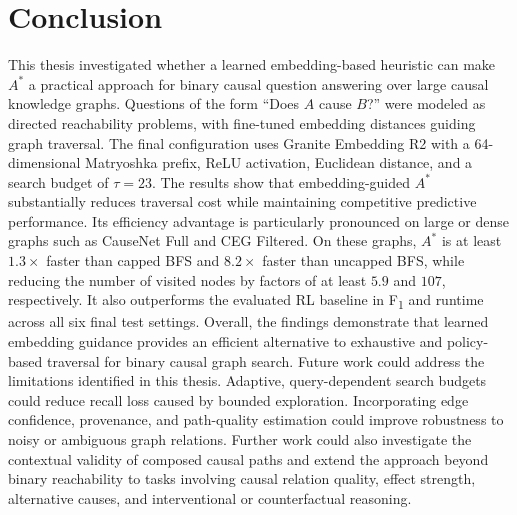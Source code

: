 \chapter{Conclusion}
\label{chap:conclusion}

This thesis investigated whether a learned embedding-based heuristic can make $A^*$ a practical approach for binary causal question answering over large causal knowledge graphs. Questions of the form ``Does $A$ cause $B$?'' were modeled as directed reachability problems, with fine-tuned embedding distances guiding graph traversal. The final configuration uses Granite Embedding R2 with a 64-dimensional Matryoshka prefix, ReLU activation, Euclidean distance, and a search budget of $\tau=23$. The results show that embedding-guided $A^*$ substantially reduces traversal cost while maintaining competitive predictive performance. Its efficiency advantage is particularly pronounced on large or dense graphs such as CauseNet Full and CEG Filtered. On these graphs, $A^*$ is at least $1.3\times$ faster than capped BFS and $8.2\times$ faster than uncapped BFS, while reducing the number of visited nodes by factors of at least $5.9$ and $107$, respectively. It also outperforms the evaluated RL baseline in F\textsubscript{1} and runtime across all six final test settings. Overall, the findings demonstrate that learned embedding guidance provides an efficient alternative to exhaustive and policy-based traversal for binary causal graph search. Future work could address the limitations identified in this thesis. Adaptive, query-dependent search budgets could reduce recall loss caused by bounded exploration. Incorporating edge confidence, provenance, and path-quality estimation could improve robustness to noisy or ambiguous graph relations. Further work could also investigate the contextual validity of composed causal paths and extend the approach beyond binary reachability to tasks involving causal relation quality, effect strength, alternative causes, and interventional or counterfactual reasoning.